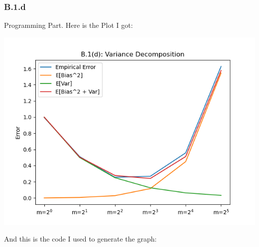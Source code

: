 \documentclass[]{article}
\begin{document}
    \subsubsection*{B.1.d}
        Programming Part. Here is the Plot I got: 
        \begin{center}
            \includegraphics{B.1(d)plot.png}
        \end{center}
        And this is the code I used to generate the graph: 
\end{document}
